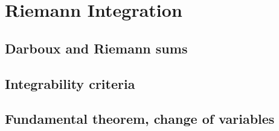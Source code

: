 
\section{Riemann Integration}

\subsection{Darboux and Riemann sums}


\subsection{Integrability criteria}


\subsection{Fundamental theorem, change of variables}

